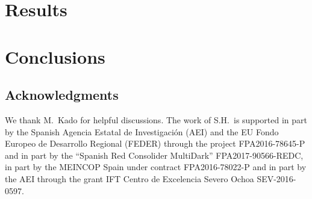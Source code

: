 \documentclass[12pt]{article}
\begin{document}
\section{Results}
\label{sec:results}



\section {Conclusions}
\label{sec:conclusion}



\subsection*{Acknowledgments}

We thank
M.~Kado
for helpful discussions.
The work of S.H.\ is supported in part by the
Spanish Agencia Estatal de Investigaci{\' o}n (AEI) and the EU Fondo Europeo de
Desarrollo Regional (FEDER) through the project FPA2016-78645-P and in part by
the “Spanish Red Consolider MultiDark” FPA2017-90566-REDC, in
part by the MEINCOP Spain under contract FPA2016-78022-P and in part by
the AEI through the grant IFT Centro de Excelencia Severo Ochoa SEV-2016-0597.
  
\end{document}
